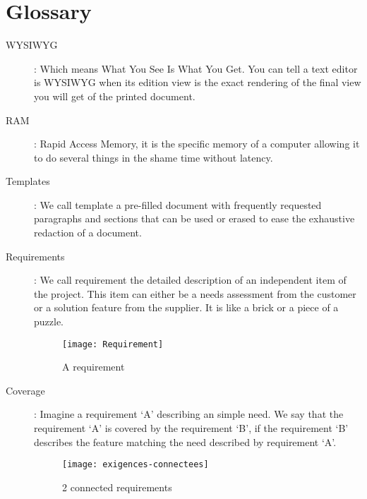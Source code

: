 \setchapterpreamble[u]{\margintoc}
\chapter{Glossary}

\begin{description}
\item[WYSIWYG] : Which means What You See Is What You Get. You can tell a text editor is WYSIWYG when its edition view is the exact rendering of the final view you will get of the printed document.

\item[RAM] : Rapid Access Memory, it is the specific memory of a computer allowing it to do several things in the shame time without latency.

\item[Templates] : We call template a pre-filled document with frequently requested paragraphs and sections that can be used or erased to ease the exhaustive redaction of a document.

\item[Requirements] : We call requirement the detailed description of an independent item of the project. This item can either be a needs assessment from the customer or a solution feature from the supplier. It is like a brick or a piece of a puzzle.
\begin{figure}[h]
    \centering
    \texttt{[image: Requirement]}
    \caption{A requirement}
    \label{fig:mesh1}
\end{figure}

\item[Coverage] : Imagine a requirement ‘A’ describing an simple need.
We say that the requirement ‘A’ is covered by the requirement ‘B’, if the requirement ‘B’ describes the feature matching the need described by requirement ‘A’. 
\begin{figure}[h]
    \centering
    \texttt{[image: exigences-connectees]}
    \caption{2 connected requirements}
    \label{fig:mesh2}
\end{figure}


\end{description}
